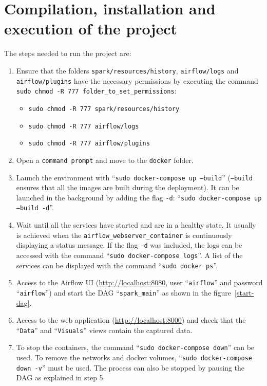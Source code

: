 
\section{Compilation, installation and execution of the project} \label{programmer_execute}
\nonzeroparskip The steps needed to run the project are:
\begin{enumerate}
	\item Ensure that the folders \texttt{spark/resources/history}, \texttt{airflow/logs} and \texttt{airflow/plugins} have the necessary permissions by executing the command \texttt{sudo chmod -R 777 folder\_to\_set\_permissions}:
	\begin{itemize}
		\item \texttt{sudo chmod -R 777 spark/resources/history}
		\item \texttt{sudo chmod -R 777 airflow/logs}
		\item \texttt{sudo chmod -R 777 airflow/plugins}
	\end{itemize}
	\item Open a \texttt{command prompt} and move to the \texttt{docker} folder.
	\item Launch the environment with ``\texttt{sudo docker-compose up --build}'' (\texttt{--build} ensures that all the images are built during the deployment). It can be launched in the background by adding the flag \texttt{-d}: ``\texttt{sudo docker-compose up --build -d}''.
	\item Wait until all the services have started and are in a healthy state. It usually is achieved when the \texttt{airflow\_webserver\_container} is continuously displaying a status message. If the flag \texttt{-d} was included, the logs can be accessed with the command ``\texttt{sudo docker-compose logs}''. A list of the services can be displayed with the command ``\texttt{sudo docker ps}''.
	\item Access to the Airflow UI (\url{http://localhost:8080}, user ``\texttt{airflow}'' and password ``\texttt{airflow}'') and start the DAG ``\texttt{spark\_main}'' as shown in the figure~\ref{start-dag}.
	\item Access to the web application (\url{http://localhost:8000}) and check that the ``\texttt{Data}'' and ``\texttt{Visuals}'' views contain the captured data.
	\item To stop the containers, the command ``\texttt{sudo docker-compose down}'' can be used. To remove the networks and docker volumes, ``\texttt{sudo docker-compose down -v}'' must be used. The process can also be stopped by pausing the DAG as explained in step 5.
\end{enumerate}

